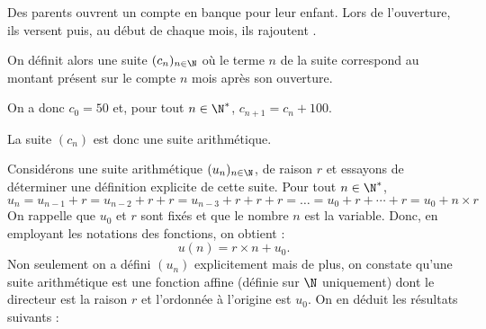 \documentclass[10pt,openright,twoside,french]{book}
\begin{document}
\begin{Exemple}
    Des parents ouvrent un compte en banque pour leur enfant. Lors de l'ouverture, ils  versent  puis, au début de chaque mois, ils rajoutent .\par
    On définit alors une suite $(c_n)_{n\in\N}$ où le terme $n$ de la suite correspond au montant présent sur le compte $n$ mois après son ouverture.\par
    On a donc $c_0 = 50$ et, pour tout $n \in \N^*$, $c_{n+1} = c_n + 100$.\par
    La suite $(c_n)$ est donc une suite arithmétique.

    \begin{center}
\end{center}
\end{Exemple}\medskip

\begin{Rmq}
    Considérons une suite arithmétique $(u_n)_{n \in \N}$, de raison $r$ et essayons de déterminer une définition explicite de cette suite. Pour tout $n \in \N^*$,
    \[u_{n} = u_{n-1} + r = u_{n-2} + r + r = u_{n-3} + r + r + r = \ldots = u_0 + r + \cdots + r = u_0 + n \times r\]
    On rappelle que $u_0$ et $r$ sont fixés et que le nombre $n$ est la variable. Donc, en employant les notations des fonctions, on obtient :
    \[u(n) = r \times n + u_0.\]
    Non seulement on a défini $(u_n)$ explicitement mais de plus, on constate qu'une suite arithmétique est une fonction affine (définie sur $\N$ uniquement) dont le \coef directeur est la raison $r$ et l'ordonnée à l'origine est $u_0$. On en déduit les résultats suivants :
\end{Rmq}\medskip
\end{document}
